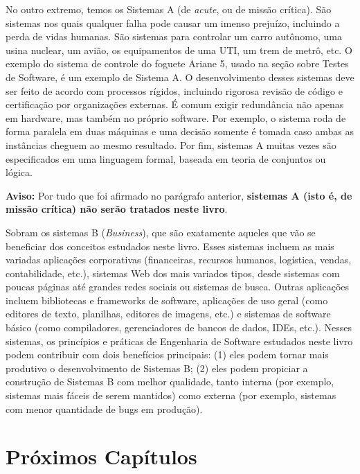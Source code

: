 \documentclass[
  11pt,
  twoside]{book}
\newenvironment{aviso}{\centering \vspace{1.5ex} \begin{tcolorbox}[breakable, colback=backcolor, width=4.9in]}{\end{tcolorbox} \vspace{1.5ex}}
\begin{document}
 No outro extremo, temos os Sistemas A
(de \emph{acute}, ou de missão crítica). São sistemas nos quais qualquer
falha pode causar um imenso prejuízo, incluindo a perda de vidas
humanas. São sistemas para controlar um carro autônomo, uma usina
nuclear, um avião, os equipamentos de uma UTI, um trem de metrô, etc. O
exemplo do sistema de controle do foguete Ariane 5, usado na seção sobre
Testes de Software, é um exemplo de Sistema A. O desenvolvimento desses
sistemas deve ser feito de acordo com processos rígidos, incluindo
rigorosa revisão de código e certificação por organizações externas. É
comum exigir redundância não apenas em hardware, mas também no próprio
software. Por exemplo, o sistema roda de forma paralela em duas máquinas
e uma decisão somente é tomada caso ambas as instâncias cheguem ao mesmo
resultado. Por fim, sistemas A muitas vezes são especificados em uma
linguagem formal, baseada em teoria de conjuntos ou lógica.

\begin{aviso}

\textbf{Aviso:} Por tudo que foi afirmado no parágrafo anterior,
\textbf{sistemas A (isto é, de missão crítica) não serão tratados neste
livro}.

\end{aviso}

Sobram os sistemas B (\emph{Business}), que são exatamente aqueles que
vão se beneficiar dos conceitos estudados neste livro. Esses sistemas
incluem as mais variadas aplicações corporativas (financeiras, recursos
humanos, logística, vendas, contabilidade, etc.), sistemas Web dos mais
variados tipos, desde sistemas com poucas páginas até grandes redes
sociais ou sistemas de busca. Outras aplicações incluem bibliotecas e
frameworks de software, aplicações de uso geral (como editores de texto,
planilhas, editores de imagens, etc.) e sistemas de software básico
(como compiladores, gerenciadores de bancos de dados, IDEs, etc.).
Nesses sistemas, os princípios e práticas de Engenharia de Software
estudados neste livro podem contribuir com dois benefícios principais:
(1) eles podem tornar mais produtivo o desenvolvimento de Sistemas B;
(2) eles podem propiciar a construção de Sistemas B com melhor
qualidade, tanto interna (por exemplo, sistemas mais fáceis de serem
mantidos) como externa (por exemplo, sistemas com menor quantidade de
bugs em produção).

\hypertarget{pruxf3ximos-capuxedtulos}{%
\section{Próximos Capítulos}\label{pruxf3ximos-capuxedtulos}}
\end{document}
